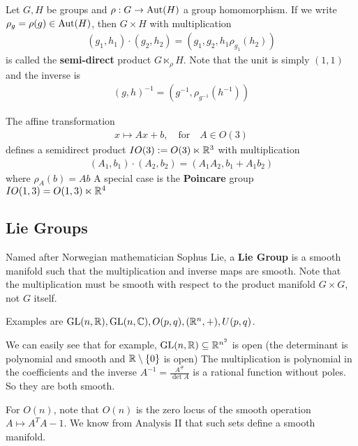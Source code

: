 \begin{dfn}[]
  Let $G,H$ be groups and $\rho: G \to  \operatorname{Aut}(H)$ a group homomorphism. If we write $\rho_g = \rho(g) \in \operatorname{Aut}(H)$, then $G \times H$ with multiplication
  \begin{align*}
    (g_1,h_1) \cdot (g_2,h_2) = (g_1,g_2, h_1 \rho_{g_1}(h_2))
  \end{align*}
  is called the \textbf{semi-direct} product $G \ltimes_{\rho} H$. Note that the unit is simply $(1,1)$ and the inverse is
  \begin{align*}
    (g,h)^{-1} = (g^{-1},\rho_{g^{-1}}(h^{-1}))
  \end{align*}
\end{dfn}
\begin{ex}[]
The affine transformation
  \begin{align*}
    x \mapsto Ax + b, \quad \text{for} \quad A \in O(3)
  \end{align*}
  defines a semidirect product $IO(3) := O(3) \ltimes \mathbb{R}^3$ with multiplication
  \begin{align*}
    (A_1,b_1) \cdot (A_2,b_2) = (A_1A_2, b_1 + A_1 b_2)
  \end{align*}
  where $\rho_A(b) = Ab$
  A special case is the \textbf{Poincare} group $IO(1,3) = O(1,3) \ltimes \mathbb{R}^4$
\end{ex}

\subsection{Lie Groups}
\begin{dfn}[]
  Named after Norwegian mathematician Sophus Lie, a \textbf{Lie Group} is a smooth manifold such that the multiplication and inverse maps are smooth. 
  Note that the multiplication must be smooth with respect to the product manifold $G \times G$, not $G$ itself.
\end{dfn}
Examples are $\operatorname{GL}(n,\mathbb{R}), \operatorname{GL}(n,\mathbb{C}), O(p,q), (\mathbb{R}^n,+), U(p,q)$.

We can easily see that for example, $\operatorname{GL}(n,\mathbb{R}) \subseteq \mathbb{R}^{n^2}$ is open (the determinant is polynomial and smooth and $\mathbb{R} \setminus \{0\}$ is open)
The multiplication is polynomial in the coefficients and the inverse $A^{-1} = \frac{A^{\#}}{\det A}$ is a rational function without poles. So they are both smooth.

For $O(n)$, note that $O(n)$ is the zero locus of the smooth operation $A \mapsto A^{T}A - 1$. We know from Analysis II that such sets define a smooth manifold.




